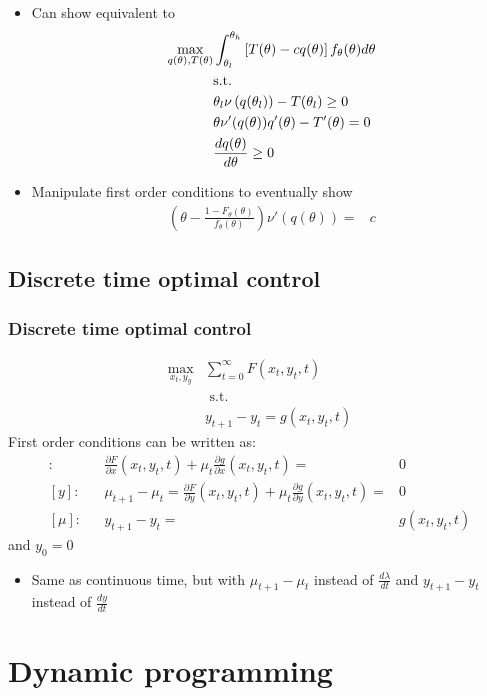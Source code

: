 \documentclass[compress]{beamer}
\begin{document}
\begin{frame}
  \begin{itemize}
  \item Can show equivalent to
    \begin{align}
      \max_{q(\theta),T(\theta)} & \int_{\theta_l}^{\theta_h} 
      \left[T(\theta) - cq(\theta)\right]
      f_\theta(\theta) d\theta \notag \\
      & \text{s.t.} \notag \\
      &\theta_l \nu\left(q(\theta_l)\right) - T(\theta_l) \geq 0
      \label{pcl} \\
      & \theta \nu'(q(\theta))q'(\theta) - T'(\theta) =  0 \label{lic2} \\
      & \frac{dq(\theta)}{d\theta} \geq  0 \label{mon2}
    \end{align}
  \item Manipulate first order conditions to eventually show
    \begin{align*}
      \left(\theta - \frac{1-F_\theta(\theta)}{f_\theta(\theta)}
      \right)\nu'(q(\theta)) = & c 
    \end{align*}
  \end{itemize}
\end{frame}
 
\subsection{Discrete time optimal control}

\begin{frame}
  \frametitle{Discrete time optimal control}
  \begin{align*}
    \max_{x_t,y_y} & \sum_{t=0}^\infty F(x_t,y_t,t) \\
    & \text{ s.t. } \\
    & y_{t+1} - y_t = g(x_t,y_t,t) 
  \end{align*}
  First order conditions can be written as:
  \begin{align*}
    [x]: && \frac{\partial F}{\partial x}(x_t,y_t,t)  + \mu_t \frac{\partial
      g}{\partial x}(x_t,y_t,t) = &  0 \\
    [y]: && \mu_{t+1}-\mu_t = \frac{\partial F}{\partial
      y}(x_t,y_t,t)  + \mu_t \frac{\partial 
      g}{\partial y}(x_t,y_t,t) = &  0 \\
    [\mu]:&& y_{t+1} - y_t = & g(x_t,y_t,t) 
  \end{align*}
  and $y_0 = 0$
  \begin{itemize}
  \item Same as continuous time, but with $\mu_{t+1} - \mu_t$ instead
    of $\frac{d\lambda}{dt}$ and $y_{t+1}-y_t$ instead of
    $\frac{dy}{dt}$
  \end{itemize}
\end{frame}

\section{Dynamic programming}

\end{document}
